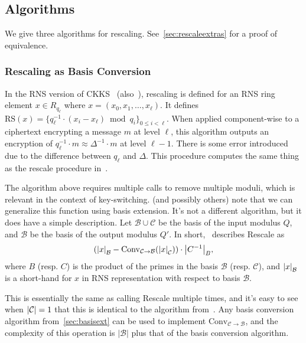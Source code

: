 \documentclass[../keyswitching.tex]{subfiles}
\begin{document}
\subsection{Algorithms}
\label{sec:rescale-algs}
We give three algorithms for rescaling. See~\cref{sec:rescaleextras} for a proof of equivalence.

\subsubsection{Rescaling as Basis Conversion}
In the RNS version of CKKS~\cite{cryptoeprint:2018/931} (also~\cite{cryptoeprint:2019/688, cryptoeprint:2016/510}), rescaling is defined for an RNS ring element $x\in R_{q_\ell}$ where $x=(x_0, x_1, \ldots, x_\ell)$. It defines $\mathrm{RS}(x) = \{q_\ell^{-1}\cdot (x_i-x_\ell)\bmod q_i\}_{0\le i<\ell}$. When applied component-wise to a ciphertext encrypting a message $m$ at level $\ell$, this algorithm outputs an encryption of $q_\ell^{-1}\cdot m\approx \Delta^{-1}\cdot m$ at level $\ell-1$. There is some error introduced due to the difference between $q_\ell$ and $\Delta$. This procedure computes the same thing as the rescale procedure in~\cite{cryptoeprint:2016/421}.

The algorithm above requires multiple calls to remove multiple moduli, which is relevant in the context of key-switching. \cite{cryptoeprint:2019/688} (and possibly others) note that we can generalize this function using basis extension. It's not a different algorithm, but it does have a simple description. Let $\mathcal{B}\cup\mathcal{C}$ be the basis of the input modulus $Q$, and $\mathcal{B}$ be the basis of the output modulus $Q'$. 
In short,~\cite{cryptoeprint:2019/688} describes \textrm{Rescale} as
\[(\abs*{x}_\mathcal{B} - \mathrm{Conv}_{\mathcal{C}\rightarrow\mathcal{B}}(\abs*{x}_\mathcal{C}))\cdot \abs*{C^{-1}}_B,\]
where $B$ (resp. $C$) is the product of the primes in the basis $\mathcal{B}$ (resp. $\mathcal{C}$), and $\abs*{x}_\mathcal{B}$ is a short-hand for $x$ in RNS representation with respect to basis $\mathcal{B}$.

This is essentially the same as calling \textrm{Rescale} multiple times, and it's easy to see when $\abs{\mathcal{C}}=1$ that this is identical to the algorithm from~\cite{cryptoeprint:2018/931}. Any basis conversion algorithm from~\cref{sec:basisext} can be used to implement $\mathrm{Conv}_{\mathcal{C}\rightarrow\mathcal{B}}$, and the complexity of this operation is $|\mathcal{B}|$ plus that of the basis conversion algorithm.
\end{document}
